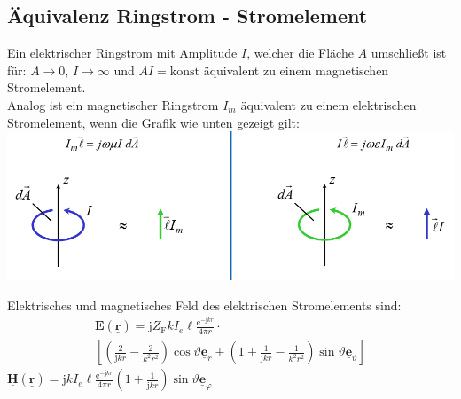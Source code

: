 \documentclass[english]{latex4ei/latex4ei_sheet}
\renewcommand{\vec}[1]{\underline{\boldsymbol{#1}}}
\begin{document}
\begin{sectionbox}
    \subsection{Äquivalenz Ringstrom - Stromelement}
    Ein elektrischer Ringstrom mit Amplitude $I$, welcher die Fläche $A$ umschließt ist für: $A\to 0$, $I \to \infty$ und $AI = \text{konst}$ äquivalent zu einem magnetischen Stromelement.\\
    Analog ist ein magnetischer Ringstrom $I_m$ äquivalent zu einem elektrischen Stromelement, wenn die Grafik wie unten gezeigt gilt:\\
    \includegraphics[width=\textwidth]{./img/antennen_ringstrom_zwei.png}
\end{sectionbox}

\begin{sectionbox}
    Elektrisches und magnetisches Feld des elektrischen Stromelements sind:
    \begin{multline*}
        \vec{E}(\vec{r})= \mathrm{j} Z_{\mathrm{F}} k I_{e} \ell \frac{\mathrm{e}^{-\mathrm{j} k r}}{4 \pi r} \cdot \\
        \left[\left(\frac{2}{\mathrm{j} k r}-\frac{2}{k^{2} r^{2}}\right) \cos \vartheta \vec{e}_{r}+\left(1+\frac{1}{\mathrm{j} k r}-\frac{1}{k^{2} r^{2}}\right) \sin \vartheta \vec{e}_{\vartheta}\right]
    \end{multline*}
    $\vec{H}(\vec{r})=\mathrm{j} k I_{e} \ell \frac{\mathrm{e}^{-\mathrm{j} k r}}{4 \pi r}\left(1+\frac{1}{\mathrm{j} k r}\right) \sin \vartheta \vec{e}_{\varphi}$

\end{sectionbox}
\end{document}
